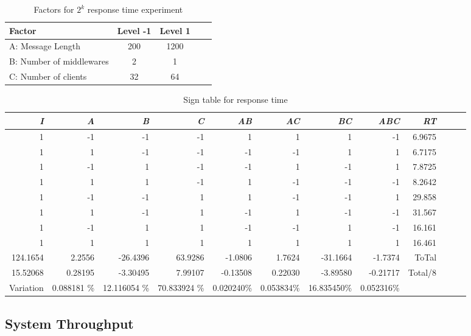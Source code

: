 \documentclass[11pt]{article}
\begin{document}
\begin{table}[ht]
\centering
\begin{tabular}{l*{3}{c}r}
Factor                   & Level -1 & Level 1  \\
\hline
A: Message Length           & 200 & 1200   \\
B: Number of middlewares    & 2    & 1  \\
C: Number of clients        & 32 & 64  \\
\end{tabular}
\caption{Factors for $2^k$ response time experiment}
\label{table:f_2k_response_time}
\end{table}

\begin{table}[!ht]
\begin{adjustbox}{width=1\textwidth}
\begin{tabular}{*{12}r}  \toprule
\emph{I} &  \emph{A} & \emph{B}  & \emph{C} & \emph{AB} & \emph{AC} & \emph{BC} & \emph{ABC} & \emph{RT}  \\\midrule
1  & -1 & -1 & -1 &  1  &  1  &  1  & -1  &  6.9675 \\
1  &  1 & -1 & -1 & -1  & -1  &  1  &  1  &  6.7175 \\
1  & -1 &  1 & -1 & -1  &  1  & -1  &  1  &  7.8725\\
1  &  1 &  1 & -1 &  1  & -1  & -1  & -1  &  8.2642 \\ 
1  & -1 & -1 &  1 &  1  & -1  & -1  &  1  &  29.858 \\
1  &  1 & -1 &  1 & -1  &  1  & -1  & -1  &  31.567 \\
1  & -1 &  1 &  1 & -1  & -1  &  1  & -1  &  16.161 \\
1  &  1 &  1 &  1 &  1  &  1  &  1  &  1  &  16.461 \\\hline
124.1654 & 2.2556 &  -26.4396 &   63.9286 &   -1.0806 &    1.7624 &  -31.1664 & -1.7374 & ToTal\\
15.52068 & 0.28195 &  -3.30495&    7.99107&   -0.13508&    0.22030&   -3.89580& -0.21717 & Total/8 \\
Variation & 0.088181 \% &   12.116054 \% &  70.833924 \% &    0.020240\% &   0.053834\%  &  16.835450\% & 0.052316\%  \\ \hline    
\end{tabular}
\end{adjustbox}
\caption{Sign table for response time}
\label{table:response_2k}
\centering
\end{table}


\subsection{System Throughput}\label{sec:system-throughput}
\end{document}
